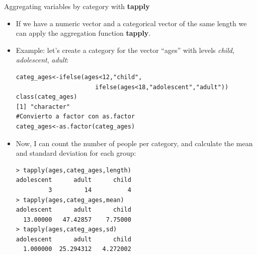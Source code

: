 \documentclass[handout]{beamer}
\begin{document}
\begin{frame}[fragile]{Aggregating variables by category with \textbf{tapply}}
\scriptsize{
\begin{itemize}
 \item If we have a numeric vector and a categorical vector of the same length we can apply the aggregation function \textbf{tapply}.
 \item Example: let's create a category for the vector ``ages'' with levels \emph{child}, \emph{adolescent}, \emph{adult}:
 \begin{verbatim}
categ_ages<-ifelse(ages<12,"child",
                      ifelse(ages<18,"adolescent","adult"))
class(categ_ages)
[1] "character"
#Convierto a factor con as.factor
categ_ages<-as.factor(categ_ages)
 \end{verbatim}

 \item Now, I can count the number of people per category, and calculate the mean and standard deviation for each group:
\begin{verbatim}
> tapply(ages,categ_ages,length)
adolescent      adult      child 
         3         14          4 
> tapply(ages,categ_ages,mean)
adolescent      adult      child 
  13.00000   47.42857    7.75000 
> tapply(ages,categ_ages,sd)
adolescent      adult      child 
  1.000000  25.294312   4.272002  
\end{verbatim}

 
\end{itemize}



}
\end{frame}
\end{document}
